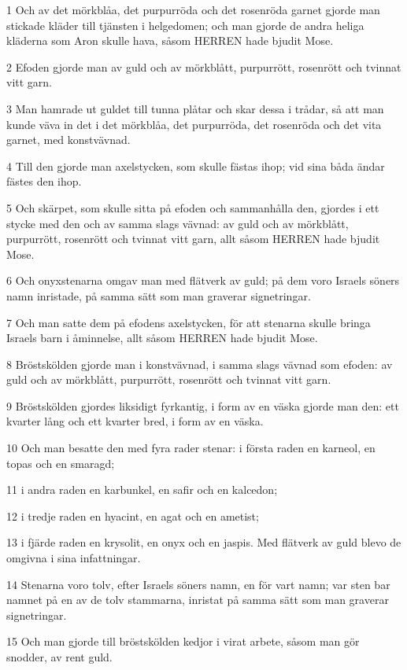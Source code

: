 \par 1 Och av det mörkblåa, det purpurröda och det rosenröda garnet gjorde man stickade kläder till tjänsten i helgedomen; och man gjorde de andra heliga kläderna som Aron skulle hava, såsom HERREN hade bjudit Mose.
\par 2 Efoden gjorde man av guld och av mörkblått, purpurrött, rosenrött och tvinnat vitt garn.
\par 3 Man hamrade ut guldet till tunna plåtar och skar dessa i trådar, så att man kunde väva in det i det mörkblåa, det purpurröda, det rosenröda och det vita garnet, med konstvävnad.
\par 4 Till den gjorde man axelstycken, som skulle fästas ihop; vid sina båda ändar fästes den ihop.
\par 5 Och skärpet, som skulle sitta på efoden och sammanhålla den, gjordes i ett stycke med den och av samma slags vävnad: av guld och av mörkblått, purpurrött, rosenrött och tvinnat vitt garn, allt såsom HERREN hade bjudit Mose.
\par 6 Och onyxstenarna omgav man med flätverk av guld; på dem voro Israels söners namn inristade, på samma sätt som man graverar signetringar.
\par 7 Och man satte dem på efodens axelstycken, för att stenarna skulle bringa Israels barn i åminnelse, allt såsom HERREN hade bjudit Mose.
\par 8 Bröstskölden gjorde man i konstvävnad, i samma slags vävnad som efoden: av guld och av mörkblått, purpurrött, rosenrött och tvinnat vitt garn.
\par 9 Bröstskölden gjordes liksidigt fyrkantig, i form av en väska gjorde man den: ett kvarter lång och ett kvarter bred, i form av en väska.
\par 10 Och man besatte den med fyra rader stenar: i första raden en karneol, en topas och en smaragd;
\par 11 i andra raden en karbunkel, en safir och en kalcedon;
\par 12 i tredje raden en hyacint, en agat och en ametist;
\par 13 i fjärde raden en krysolit, en onyx och en jaspis. Med flätverk av guld blevo de omgivna i sina infattningar.
\par 14 Stenarna voro tolv, efter Israels söners namn, en för vart namn; var sten bar namnet på en av de tolv stammarna, inristat på samma sätt som man graverar signetringar.
\par 15 Och man gjorde till bröstskölden kedjor i virat arbete, såsom man gör snodder, av rent guld.
